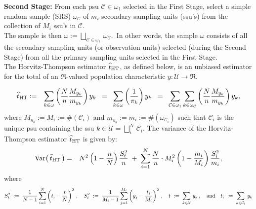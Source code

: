 \documentclass{article}
\begin{document}
\noindent
\textbf{Second Stage:} \; From each psu $\mathcal{C} \in \omega_{1}$ selected in the First Stage, select a simple random sample (SRS) $\omega_{\mathcal{C}}$ of $m_{i}$ secondary sampling units (ssu's) from the collection of $M_{i}$ ssu's in $\mathcal{C}$. \\

\noindent
The sample is then $\omega := \displaystyle{\bigsqcup_{\mathcal{C}\in\omega_{1}}}\,\omega_{\mathcal{C}}$. \,In other words, the sample $\omega$ consists of all the secondary sampling units (or observation units) selected (during the Second Stage) from all the primary sampling units selected in the First Stage. \\

\noindent
The Horvitz-Thompson estimator $\widehat{t}_{\textnormal{HT}}$, as defined below, is an unbiased estimator for the total of an $\Re$-valued population characteristic $y : \mathcal{U} \longrightarrow \Re$.

\begin{eqnarray*}
\widehat{t}_{\textnormal{HT}}
& := & \sum_{k\in\omega}\left(\dfrac{N}{n}\dfrac{M_{y_{k}}}{m_{y_{k}}}\right)y_{k}
\;\;=\;\; \sum_{k\in\omega}\left(\dfrac{1}{\pi_{k}}\right)y_{k}
\;\;=\;\; \sum_{\mathcal{C}\in\omega_{1}} \sum_{k\in\omega_{\mathcal{C}}}\left(\dfrac{N}{n}\dfrac{M_{y_{k}}}{m_{y_{k}}}\right)y_{k},
\end{eqnarray*}
where $M_{y_{k}} := M_{i} := \#(\mathcal{C}_{i})$ and $m_{y_{k}} := m_{i} := \#(\omega_{\mathcal{C}_{i}})$ such that $\mathcal{C}_{i}$ is the unique psu containing the ssu $k \in \mathcal{U} = \displaystyle{\bigsqcup_{i}^{N}}\,\mathcal{C}_{i}$.  The variance of the Horvitz-Thompson estimator $\widehat{t}_{\textnormal{HT}}$ is given by:
\begin{eqnarray*}
\textnormal{Var}\!\left(\,\widehat{t}_{\textnormal{HT}}\,\right)
& = & N^{2}\left(1-\dfrac{n}{N}\right)\dfrac{S^{2}_{t}}{n} \; + \; 
\sum^{N}_{i=1}\dfrac{N}{n}\cdot M_{i}^{2}\left(1-\dfrac{m_{i}}{M_{i}}\right)\dfrac{S^{2}_{i}}{m_{i}},
\end{eqnarray*}
where
\begin{equation*}
S_{t}^{2} \; := \; \dfrac{1}{N-1}\sum^{N}_{i=1}\left(t_{i}-\dfrac{t}{N}\right)^{2}
\,,\quad
S_{i}^{2} \; := \; \dfrac{1}{M_{i}-1}\sum^{M_{i}}_{j=1}\left(y_{j}-\dfrac{t_{i}}{M_{i}}\right)^{2}
\,,\quad
t \; := \; \sum_{k\in\mathcal{U}}\,y_{k}
\,,\quad\textnormal{and}\quad
t_{i} \; := \; \sum_{k\in\mathcal{C}_{i}}\,y_{k}
\end{equation*}
\end{document}

